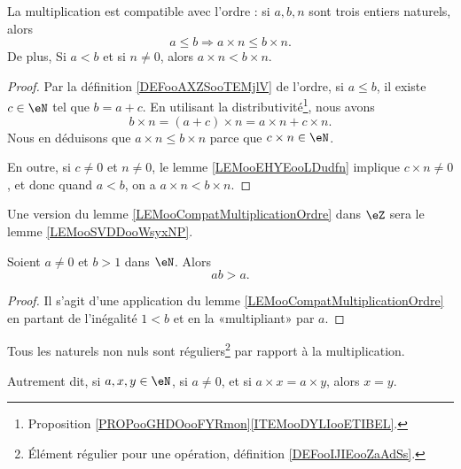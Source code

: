 \begin{lemma}	\label{LEMooCompatMultiplicationOrdre}
	La multiplication est compatible avec l'ordre : si \(a, b, n\) sont trois entiers naturels, alors
	\begin{equation}
		a\leq b\Rightarrow a\times n\leq b\times n.
	\end{equation}
	De plus, Si \( a< b\) et si \( n\neq 0\), alors \( a\times n<b\times n \).
\end{lemma}

\begin{proof}
	Par la définition \ref{DEFooAXZSooTEMjlV} de l'ordre, si \( a\leq b\), il existe \( c\in \eN\) tel que \( b=a+c\). En utilisant la distributivité\footnote{Proposition \ref{PROPooGHDOooFYRmon}\ref{ITEMooDYLIooETIBEL}.}, nous avons
	\begin{equation}
		b\times n=(a+c)\times n=a\times n+c\times n.
	\end{equation}
	Nous en déduisons que \( a\times n\leq b\times n\) parce que \( c\times n \in \eN\).

 	En outre, si \( c \neq 0 \) et \( n \neq 0 \), le lemme \ref{LEMooEHYEooLDudfn} implique \( c \times n \neq 0 \), et donc quand \( a < b \), on a \( a\times n<b\times n \).
\end{proof}

\begin{remark}	\label{REMooultiplicationNaturelsOrdreStrictZ}
	Une version du lemme \ref{LEMooCompatMultiplicationOrdre} dans \( \eZ\) sera le lemme \ref{LEMooSVDDooWsyxNP}.
\end{remark}

\begin{lemma}        \label{LEMooSFUKooBNAple}
	Soient \( a\neq 0\) et \( b>1\) dans \( \eN\). Alors
	\begin{equation}
		ab>a.
	\end{equation}
\end{lemma}

\begin{proof}
	Il s'agit d'une application du lemme \ref{LEMooCompatMultiplicationOrdre} en partant de l'inégalité \( 1<b\) et en la «multipliant» par \( a\).
\end{proof}

\begin{proposition}		\label{PROPooNaturelsReguliersMultiplication}
	Tous les naturels non nuls sont réguliers\footnote{Élément régulier pour une opération, définition \ref{DEFooIJIEooZaAdSs}.} par rapport à la multiplication.
 
 	Autrement dit, si \( a, x, y \in \eN \), si \( a\neq 0\), et si \(a\times x = a\times y\), alors \( x = y \).
\end{proposition}

